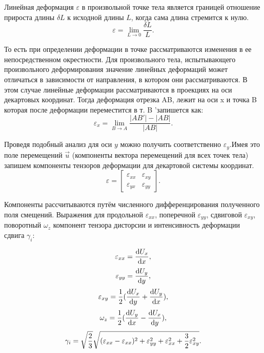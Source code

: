 Линейная деформация $\varepsilon$ в произвольной точке тела является границей отношение прироста длины $\delta L$ к исходной длины $L$, когда сама длина стремится к нулю.
\[ \varepsilon = \lim_{L \to 0} \frac{{\delta} {L}} {L}.\]

То есть при определении деформации в точке рассматриваются изменения в ее непосредственном окрестности.
Для произвольного тела, испытывающего произвольного деформирования значение линейных деформаций может отличаться в зависимости от направления, в котором они рассматриваются. В этом случае линейные деформации рассматриваются в проекциях на оси декартовых координат. Тогда деформация отрезка AB, лежит на оси x и точка B которая после деформации переместится в т. B 'запишется как:
\[ \varepsilon_x = \lim_{B \to A} {\frac{| AB '| - | AB |}{| AB |}} .\]

Проведя подобный анализ для оси $y$ можно получить соответственно $\varepsilon_y$.Имея это поле перемещений $\overrightarrow u$ (компоненты вектора перемещений для всех точек тела) запишем компоненты тензоров деформации для декартовой системы координат.
\[ \varepsilon = \left [{\begin {matrix} 
{\varepsilon_{xx}} & {\varepsilon_{xy}} \\ 
{\varepsilon_{yx}} & {\varepsilon_{yy}} 
\end{matrix}} \right].\]

Компоненты рассчитываются путём численного дифференцирования полученного поля смещений. Выражения для продольной $\varepsilon_{xx}$, поперечной $\varepsilon_{yy}$, сдвиговой $\varepsilon_{xy}$, поворотный $\omega_z$ компонент тензора дисторсии и интенсивность деформации сдвига $\gamma_i$:

\begin{equation}
\numberwithin{equation}{section}
\label{eq:e_xx}
\varepsilon_{xx}= \frac{\mathrm{d} U_x}{\mathrm{d} x},
\end{equation}
\begin{equation}
\numberwithin{equation}{section}
\label{eq:e_yy}
\varepsilon_{yy}= \frac{\mathrm{d} U_y}{\mathrm{d} y},
\end{equation}
\begin{equation}
\numberwithin{equation}{section}
\label{eq:e_xy}
\varepsilon_{xy}=\frac{1}{2}(\frac{\mathrm{d} U_x}{\mathrm{d} y} + \frac{\mathrm{d} U_y}{\mathrm{d} x}),
\end{equation}
\begin{equation}
\numberwithin{equation}{section}
\label{eq:w_z}
\omega_z=\frac{1}{2}(\frac{\mathrm{d} U_y}{\mathrm{d} x} - \frac{\mathrm{d} U_x}{\mathrm{d} y}),
\end{equation}
\begin{equation}
\numberwithin{equation}{section}
\label{eq:gamma_i}
\gamma_i = \sqrt\frac{2}{3}\sqrt{(\varepsilon_{xx}-\varepsilon_{xx})^2+\varepsilon_{yy}^2+\varepsilon_{xx}^2 + \frac{3}{2}\varepsilon_{xy}^2}.
\end{equation}